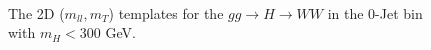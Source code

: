 \begin{figure}[!hbtp]
{}
 \\
\caption{ The 2D ($m_{ll}, m_T$) templates for the $gg\to H\to WW$ in the 0-Jet bin with $m_H<300$ GeV. }
\label{fig:hww2d_lowmass_0j}
\end{figure}


